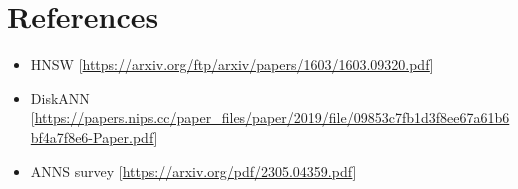 \section{References}

\begin{frame}
    \begin{itemize}
        \item HNSW [\href{https://arxiv.org/ftp/arxiv/papers/1603/1603.09320.pdf}{https://arxiv.org/ftp/arxiv/papers/1603/1603.09320.pdf}]
        \item DiskANN [\href{https://papers.nips.cc/paper\_files/paper/2019/file/09853c7fb1d3f8ee67a61b6bf4a7f8e6-Paper.pdf}{https://papers.nips.cc/paper\_files/paper/2019/file/09853c7fb1d3f8ee67a61b6bf4a7f8e6-Paper.pdf}]
        \item ANNS survey [\href{https://arxiv.org/pdf/2305.04359.pdf}{https://arxiv.org/pdf/2305.04359.pdf}]
    \end{itemize}
\end{frame}
